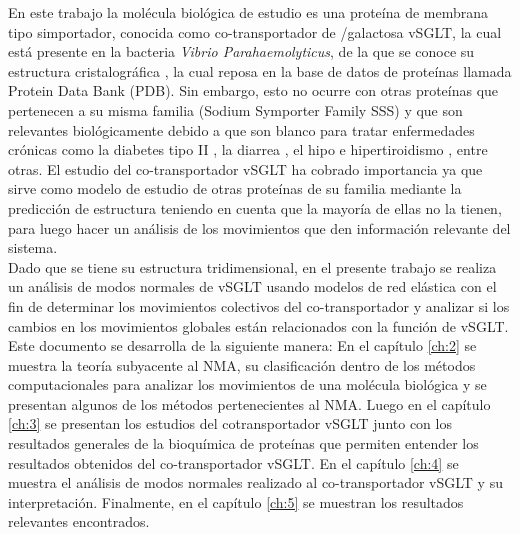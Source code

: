 En este trabajo la mol\'{e}cula biol\'{o}gica de estudio es una prote\'{i}na de membrana tipo simportador, conocida como co-transportador de /galactosa vSGLT, la cual est\'{a} presente en la bacteria \textit{Vibrio Parahaemolyticus}, de la que se conoce su estructura cristalogr\'{a}fica \cite{Faham2008}, la cual reposa en la base de datos de prote\'{i}nas llamada Protein Data Bank (PDB). Sin embargo, esto no ocurre con otras prote\'{i}nas que pertenecen a su misma familia (Sodium Symporter Family SSS) y que son relevantes biol\'{o}gicamente debido a que son blanco  para tratar enfermedades cr\'{o}nicas como la diabetes tipo II \cite{Bisha2014}, la diarrea \cite{Hamilton2013}, el hipo e hipertiroidismo \cite{Ferrandino2016}, entre otras. El estudio del co-transportador vSGLT ha cobrado importancia ya que sirve como modelo de estudio de otras prote\'{i}nas de su familia mediante la predicci\'{o}n de estructura teniendo en cuenta que la mayor\'{i}a de ellas no la tienen, para luego hacer un an\'{a}lisis de los movimientos que den informaci\'{o}n relevante del sistema.\\

Dado que se tiene su estructura tridimensional, en el  presente trabajo se realiza un an\'{a}lisis de modos normales de vSGLT usando modelos de red el\'{a}stica con el fin de determinar los movimientos colectivos del co-transportador y analizar si los cambios en los movimientos globales est\'{a}n relacionados con la funci\'{o}n de vSGLT.\\

Este documento se desarrolla de la siguiente manera: En el cap\'{i}tulo \ref{ch:2} se muestra la teor\'{i}a subyacente al NMA, su clasificaci\'{o}n dentro de los m\'{e}todos computacionales para analizar los movimientos de una mol\'{e}cula biol\'{o}gica y se presentan algunos de los m\'{e}todos pertenecientes al NMA. Luego en el cap\'{i}tulo \ref{ch:3} se presentan los estudios del cotransportador vSGLT junto con los resultados generales de la bioqu\'{i}mica de prote\'{i}nas que permiten entender los resultados obtenidos del co-transportador vSGLT. En el cap\'{i}tulo \ref{ch:4} se muestra el an\'{a}lisis de modos normales realizado al co-transportador vSGLT y su interpretaci\'{o}n. Finalmente, en el cap\'{i}tulo \ref{ch:5} se muestran los resultados relevantes encontrados.\\
